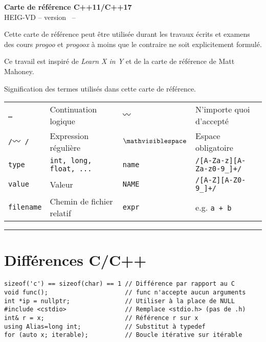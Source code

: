 \documentclass{article}
\newcommand{\etc}{\small \ldots}
\newcommand{\any}{$\hzigzag$~}
\newcommand{\spc}{$\mathvisiblespace$}
\newcommand{\cd}{\lstinline}
\begin{document}
\begin{multicols*}{3}

\begin{center}
  {\Large \bf Carte de référence C++11/C++17} \\
  HEIG-VD -- version \revision \ -- \revisiondate \\
\end{center}

Cette carte de référence peut être utilisée durant les travaux écrits et examens
des cours \emph{progoo} et \emph{progoox} à moins que le contraire ne soit explicitement formulé.

Ce travail est inspiré de \emph{Learn X in Y} et de la carte de référence de Matt Mahoney.

Signification des termes utilisés dans cette carte de référence.

\begin{tabularx}{\linewidth}{
  >{\hsize=0.5\hsize}X%
  >{\hsize=1.5\hsize}X%
  >{\hsize=0.5\hsize}X%
  >{\hsize=1.5\hsize}X%
  }

  \tt \etc      & Continuation logique    & \tt \any    & N'importe quoi d'accepté \\
  \tt /\any/    & Expression régulière    & \tt \spc    & Espace obligatoire \\
  \cd{type}     & \tt int, long, float, ... & \cd{name} & \tt /[A-Za-z][A-Za-z0-9\_]+/ \\
  \cd{value}    & Valeur & \cd{NAME} & \tt /[A-Z][A-Z0-9\_]+/ \\
  \cd{filename} & Chemin de fichier relatif & \cd{expr}   & e.g. \tt a + b \\
\end{tabularx}
\hrule

\section*{Différences C/C++}
\begin{lstlisting}
sizeof('c') == sizeof(char) == 1 // Différence par rapport au C
void func();                     // func n'accepte aucun arguments
int *ip = nullptr;               // Utiliser à la place de NULL
#include <cstdio>                // Remplace <stdio.h> (pas de .h)
int& r = x;                      // Référence r sur x
using Alias=long int;            // Substitut à typedef
for (auto x; iterable);          // Boucle itérative sur itérable
\end{lstlisting}


\end{multicols*}
\end{document}
